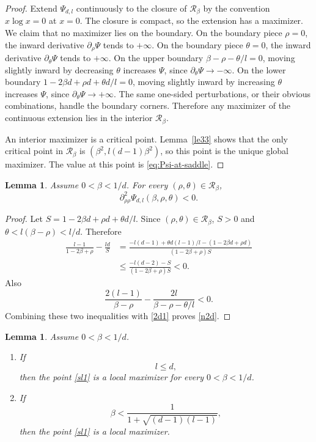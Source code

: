 \documentclass[11pt]{amsart}
\theoremstyle{plain}
\newtheorem{lemma}[theorem]{Lemma}
\numberwithin{equation}{section}
\numberwithin{theorem}{section}
\numberwithin{figure}{section}
\begin{document}
\begin{proof}
Extend $\Psi_{d,l}$ continuously to the closure of $\mathcal R_\beta$ by the convention
$x\log x=0$ at $x=0$.  The closure is compact, so the extension has a maximizer.
We claim that no maximizer lies on the boundary.  On the boundary piece $\rho=0$, the
inward derivative $\partial_\rho\Psi$ tends to $+\infty$.  On the boundary piece $\theta=0$,
the inward derivative $\partial_\theta\Psi$ tends to $+\infty$.  On the upper boundary
$\beta-\rho-\theta/l=0$, moving slightly inward by decreasing $\theta$ increases
$\Psi$, since $\partial_\theta\Psi\to-\infty$.  On the lower boundary
$1-2\beta d+\rho d+\theta d/l=0$, moving slightly inward by increasing $\theta$ increases
$\Psi$, since $\partial_\theta\Psi\to+\infty$.  The same one-sided perturbations, or their
obvious combinations, handle the boundary corners.  Therefore any maximizer of the
continuous extension lies in the interior $\mathcal R_\beta$.

An interior maximizer is a critical point.  Lemma~\ref{le33} shows that the only critical
point in $\mathcal R_\beta$ is $(\beta^2,l(d-1)\beta^2)$, so this point is the unique global
maximizer.  The value at this point is \eqref{eq:Psi-at-saddle}.
\end{proof}

\begin{lemma}\label{lm33}
Assume $0<\beta<1/d$.  For every $(\rho,\theta)\in\mathcal R_\beta$,
\begin{equation}
\partial_{\rho\rho}^2\Psi_{d,l}(\beta,\rho,\theta)<0.
\label{n2d}
\end{equation}
\end{lemma}

\begin{proof}
Let $S=1-2\beta d+\rho d+\theta d/l$.  Since $(\rho,\theta)\in\mathcal R_\beta$,
$S>0$ and $\theta<l(\beta-\rho)<l/d$.  Therefore
\begin{align*}
\frac{l-1}{1-2\beta+\rho}-\frac{ld}{S}
&=\frac{-l(d-1)+\theta d(l-1)/l-(1-2\beta d+\rho d)}{(1-2\beta+\rho)S}\\
&\leq \frac{-l(d-2)-S}{(1-2\beta+\rho)S}<0.
\end{align*}
Also
\[
\frac{2(l-1)}{\beta-\rho}-\frac{2l}{\beta-\rho-\theta/l}<0.
\]
Combining these two inequalities with \eqref{2d1} proves \eqref{n2d}.
\end{proof}

\begin{lemma}\label{l24}
Assume $0<\beta<1/d$.
\begin{enumerate}
\item If
\begin{equation}
l\leq d,
\label{ld2}
\end{equation}
then the point \eqref{sl1} is a local maximizer for every $0<\beta<1/d$.
\item If
\begin{equation}
\beta<\frac1{1+\sqrt{(d-1)(l-1)}},
\label{bld}
\end{equation}
then the point \eqref{sl1} is a local maximizer.
\end{enumerate}
\end{lemma}
\end{document}
